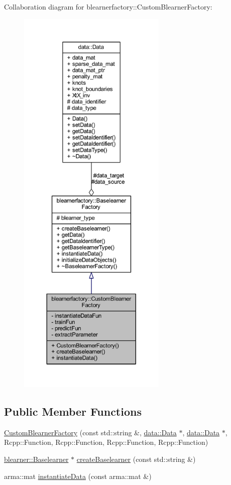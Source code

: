 Collaboration diagram for blearnerfactory\+:\+:Custom\+Blearner\+Factory\+:\nopagebreak
\begin{figure}[H]
\begin{center}
\leavevmode
\includegraphics[height=550pt]{classblearnerfactory_1_1_custom_blearner_factory__coll__graph}
\end{center}
\end{figure}
\subsection*{Public Member Functions}
\begin{DoxyCompactItemize}
\item 
\mbox{\hyperlink{classblearnerfactory_1_1_custom_blearner_factory_a1a006cb772dc79cbcbcab810f5431b2c}{Custom\+Blearner\+Factory}} (const std\+::string \&, \mbox{\hyperlink{classdata_1_1_data}{data\+::\+Data}} $\ast$, \mbox{\hyperlink{classdata_1_1_data}{data\+::\+Data}} $\ast$, Rcpp\+::\+Function, Rcpp\+::\+Function, Rcpp\+::\+Function, Rcpp\+::\+Function)
\item 
\mbox{\hyperlink{classblearner_1_1_baselearner}{blearner\+::\+Baselearner}} $\ast$ \mbox{\hyperlink{classblearnerfactory_1_1_custom_blearner_factory_aad915d1ac58a323d1584d27f8cdace56}{create\+Baselearner}} (const std\+::string \&)
\item 
arma\+::mat \mbox{\hyperlink{classblearnerfactory_1_1_custom_blearner_factory_aac818f8969820d37ec1a391abbb996da}{instantiate\+Data}} (const arma\+::mat \&)
\end{DoxyCompactItemize}
